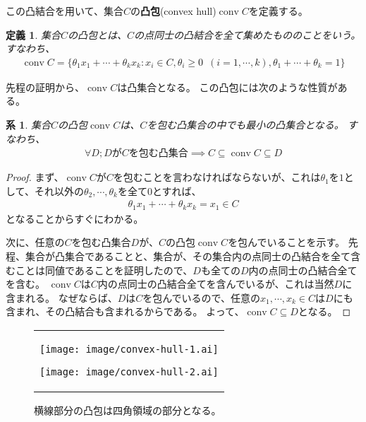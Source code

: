 \documentclass[pdflatex, ja=standard, a4paper]{bxjsarticle}
\newtheorem{definition}{定義}
\newtheorem{corollary}{系}
\newcommand{\conv}{\mathop{\mathrm{conv}}}
\begin{document}
この凸結合を用いて、集合$C$の\textbf{凸包}(convex hull)$\conv C$を定義する。
\begin{definition}
    集合$C$の凸包とは、$C$の点同士の凸結合を全て集めたもののことをいう。
    すなわち、
    \begin{align*}
        \conv C = \{\theta_1 x_1 + \cdots + \theta_k x_k : x_i \in C, \theta_i \geq 0 \enspace (i = 1, \cdots, k), \theta_1 + \cdots + \theta_k = 1\}
    \end{align*}
\end{definition}
\noindent
先程の証明から、$\conv C$は凸集合となる。
この凸包には次のような性質がある。
\begin{corollary}
    集合$C$の凸包$\conv C$は、$C$を包む凸集合の中でも最小の凸集合となる。
    すなわち、
    \begin{align*}
        \forall D; D\text{が} C \text{を包む凸集合} \implies C \subseteq \conv C \subseteq D
    \end{align*}
\end{corollary}
\begin{proof}
    まず、$\conv C$が$C$を包むことを言わなければならないが、これは$\theta_1$を$1$として、それ以外の$\theta_2, \cdots, \theta_k$を全て$0$とすれば、
    \begin{align*}
        \theta_1 x_1 + \cdots + \theta_k x_k = x_1 \in C
    \end{align*}
    となることからすぐにわかる。

    次に、任意の$C$を包む凸集合$D$が、$C$の凸包$\conv C$を包んでいることを示す。
    先程、集合が凸集合であることと、集合が、その集合内の点同士の凸結合を全て含むことは同値であることを証明したので、$D$も全ての$D$内の点同士の凸結合全てを含む。
    $\conv C$は$C$内の点同士の凸結合全てを含んでいるが、これは当然$D$に含まれる。
    なぜならば、$D$は$C$を包んでいるので、任意の$x_1, \cdots, x_k \in C$は$D$にも含まれ、その凸結合も含まれるからである。
    よって、$\conv C \subseteq D$となる。
\end{proof}

\begin{figure}
    \centering
    \begin{tabular}{c}
        \begin{minipage}{0.5\hsize}
            \centering
            \texttt{[image: image/convex-hull-1.ai]}
            \caption{$C = \{x_1, \cdots, x_{10}\}$の凸包は五角形領域の部分となる。}
        \end{minipage}
        \begin{minipage}{0.5\hsize}
            \centering
            \texttt{[image: image/convex-hull-2.ai]}
            \caption{横線部分の凸包は四角領域の部分となる。}
        \end{minipage}
    \end{tabular}
\end{figure}
\end{document}
